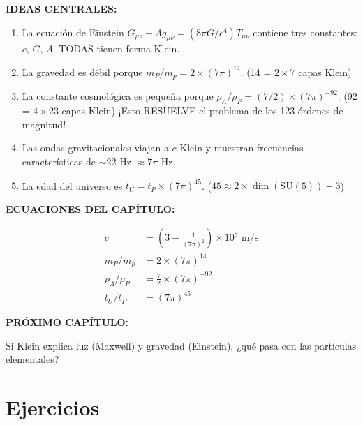 \begin{tcolorbox}[colback=kleingray, colframe=kleinblue, title=\textbf{Resumen del Capítulo 4}]

\textbf{IDEAS CENTRALES:}

\begin{enumerate}
    \item La ecuación de Einstein $G_{\mu\nu} + \Lambda g_{\mu\nu} = (8\pi G/c^4)T_{\mu\nu}$
    contiene tres constantes: $c$, $G$, $\Lambda$. TODAS tienen forma Klein.

    \item La gravedad es débil porque $m_P/m_p = 2 \times (7\pi)^{14}$.
    (14 = $2 \times 7$ capas Klein)

    \item La constante cosmológica es pequeña porque $\rho_\Lambda/\rho_P = (7/2) \times (7\pi)^{-92}$.
    (92 = $4 \times 23$ capas Klein)
    ¡Esto RESUELVE el problema de los 123 órdenes de magnitud!

    \item Las ondas gravitacionales viajan a $c$ Klein y muestran
    frecuencias características de $\sim$22 Hz $\approx 7\pi$ Hz.

    \item La edad del universo es $t_U = t_P \times (7\pi)^{45}$.
    ($45 \approx 2 \times \dim(\text{SU}(5)) - 3$)
\end{enumerate}

\vspace{0.3cm}
\textbf{ECUACIONES DEL CAPÍTULO:}

\begin{align}
c &= \left(3 - \frac{1}{(7\pi)^2}\right) \times 10^8 \text{ m/s}\\
m_P/m_p &= 2 \times (7\pi)^{14}\\
\rho_\Lambda/\rho_P &= \frac{7}{2} \times (7\pi)^{-92}\\
t_U/t_P &= (7\pi)^{45}
\end{align}

\vspace{0.3cm}
\textbf{PRÓXIMO CAPÍTULO:}

Si Klein explica luz (Maxwell) y gravedad (Einstein),
¿qué pasa con las partículas elementales?

\end{tcolorbox}


\section*{Ejercicios}

